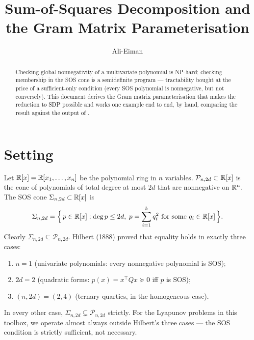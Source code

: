 \documentclass[11pt]{article}
\title{Sum-of-Squares Decomposition and the Gram Matrix Parameterisation}
\author{Ali-Eiman}
\date{}
\begin{document}
\maketitle

\begin{abstract}
Checking global nonnegativity of a multivariate polynomial is NP-hard;
checking membership in the SOS cone is a semidefinite program --- tractability
bought at the price of a sufficient-only condition (every SOS polynomial is
nonnegative, but not conversely). This document derives the Gram matrix
parameterisation that makes the reduction to SDP possible and works one
example end to end, by hand, comparing the result against the output of
.
\end{abstract}

\section{Setting}
Let $\mathbb{R}[x] = \mathbb{R}[x_1,\dots,x_n]$ be the polynomial ring in $n$ variables.
$\mathcal{P}_{n,2d} \subset \mathbb{R}[x]$ is the cone of polynomials of total degree
at most $2d$ that are nonnegative on $\mathbb{R}^n$. The SOS cone
$\Sigma_{n,2d} \subset \mathbb{R}[x]$ is
\begin{equation}
  \Sigma_{n,2d} = \Bigl\{\, p \in \mathbb{R}[x] : \deg p \le 2d,\;
p = \sum_{i=1}^k q_i^2 \text{ for some } q_i \in \mathbb{R}[x] \,\Bigr\}.
\end{equation}
Clearly $\Sigma_{n,2d} \subseteq \mathcal{P}_{n,2d}$. Hilbert (1888) proved
that equality holds in exactly three cases:
\begin{enumerate}
  \item $n = 1$ (univariate polynomials: every nonnegative polynomial is SOS);
  \item $2d = 2$ (quadratic forms: $p(x) = x^\top Q x \succeq 0$ iff
    $p$ is SOS);
  \item $(n, 2d) = (2, 4)$ (ternary quartics, in the homogeneous case).
\end{enumerate}
In every other case, $\Sigma_{n,2d} \subsetneq \mathcal{P}_{n,2d}$
strictly. For the Lyapunov problems in this toolbox, we operate almost
always outside Hilbert's three cases --- the SOS condition is strictly
sufficient, not necessary.
\end{document}

